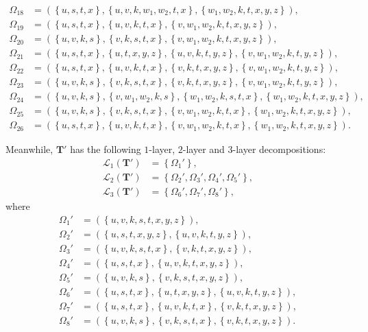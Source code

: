 \documentclass[superscriptaddress,onecolumn,nofootinbib,longbibliography,a4paper,accepted=2026-09-29]{quantumarticle}
\theoremstyle{plain}
\theoremstyle{definition}
\numberwithin{thm}{section}
\numberwithin{assumption}{section}
\numberwithin{lemma}{section}
\numberwithin{prop}{section}
\numberwithin{cor}{section}
\numberwithin{definition}{section}
\numberwithin{rmk}{section}
\numberwithin{equation}{section}
\newcommand{\lrcb}[1]{\left \{ #1 \right \}}
\newcommand{\mbf}{\mathbf{T}}
\begin{document}
\begin{itemize}
\begin{align}
\Omega_{18}&=(\lrcb{u,s,t,x}, \lrcb{u,v,k,w_1,w_2,t,x}, \lrcb{w_1,w_2,k,t,x, y,z}), \\
\Omega_{19}&=(\lrcb{u,s,t,x}, \lrcb{u,v,k,t,x}, \lrcb{v,w_1,w_2,k,t,x,y,z}), \\
\Omega_{20}&=(\lrcb{u,v,k,s}, \lrcb{v,k,s,t,x}, \lrcb{v,w_1,w_2,k,t,x,y,z}), \\
\Omega_{21}&=(\lrcb{u,s,t,x}, \lrcb{u,t,x,y,z}, \lrcb{u,v,k,t,y,z}, \lrcb{v,w_1,w_2,k,t,y,z}), \\
\Omega_{22}&=(\lrcb{u,s,t,x}, \lrcb{u,v,k,t,x}, \lrcb{v,k,t,x,y,z}, \lrcb{v,w_1,w_2,k,t,y,z}), \\
\Omega_{23}&=(\lrcb{u,v,k,s}, \lrcb{v,k,s,t,x}, \lrcb{v,k,t,x,y,z}, \lrcb{v,w_1,w_2,k,t,y,z}), \\
\Omega_{24}&=(\lrcb{u,v,k,s}, \lrcb{v,w_1,w_2,k,s}, \lrcb{w_1,w_2,k,s,t,x}, \lrcb{w_1,w_2,k,t,x,y,z}), \\
\Omega_{25}&=(\lrcb{u,v,k,s}, \lrcb{v,k,s,t,x}, \lrcb{v,w_1,w_2,k,t,x}, \lrcb{w_1,w_2,k,t,x,y,z}), \\
\Omega_{26}&=(\lrcb{u,s,t,x}, \lrcb{u,v,k,t,x}, \lrcb{v,w_1,w_2,k,t,x}, \lrcb{w_1,w_2,k,t,x,y,z}).
\end{align}

Meanwhile, $\mbf'$ has the following $1$-layer, $2$-layer and $3$-layer decompositions:
\begin{align}
\mathcal{L}_1(\mbf')&=\lrcb{\Omega_1'},     \\
\mathcal{L}_2(\mbf')&=\lrcb{\Omega_2', \Omega_3', \Omega_4', \Omega_5'}, \\
\mathcal{L}_3(\mbf')&=\lrcb{\Omega_6', \Omega_7', \Omega_8'},
\end{align}
where
\begin{align}
\Omega_1'&=(\lrcb{u,v,k,s,t,x,y,z}),    \\
\Omega_2'&=(\lrcb{u,s,t,x,y,z}, \lrcb{u,v,k,t,y,z}), \\
\Omega_3'&=(\lrcb{u,v,k,s,t,x}, \lrcb{v,k,t,x,y,z}), \\
\Omega_4'&=(\lrcb{u,s,t,x}, \lrcb{u,v,k,t,x,y,z}), \\
\Omega_5'&=(\lrcb{u,v,k,s}, \lrcb{v,k,s,t,x,y,z}), \\
\Omega_6'&=(\lrcb{u,s,t,x}, \lrcb{u,t,x,y,z}, \lrcb{u,v,k,t,y,z}), \\
\Omega_7'&=(\lrcb{u,s,t,x}, \lrcb{u,v,k,t,x}, \lrcb{v,k,t,x,y,z}), \\
\Omega_8'&=(\lrcb{u,v,k,s}, \lrcb{v,k,s,t,x}, \lrcb{v,k,t,x,y,z}).
\end{align}


\end{itemize}
\end{document}
